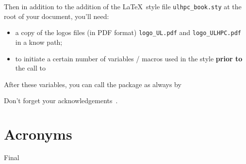 \documentclass[a4paper,11pt,twoside,a4paper]{book}
\def\reportversion{Final}  %
\begin{document}
Then in addition to the addition of the \LaTeX\ style file \texttt{ulhpc\_book.sty} at the root of your document, you'll need: 

\begin{itemize}
  \item a copy of the logos files (in PDF format) \texttt{logo\_UL.pdf} and \texttt{logo\_ULHPC.pdf} in a know path;
  \item to initiate a certain number of variables / macros used in the style \textbf{prior to} the call to 
\end{itemize}



After these variables, you can call the package as always by 



Don't forget your acknowledgements~\cite{VBCG_HPCS14}.

% 
% 


\newpage
{}


\newpage
\appendix
\chapter*{Acronyms}
% 




\backmatter
\ifx\reportversion\printversion
  \makebackpage                  %
\fi
\end{document}

